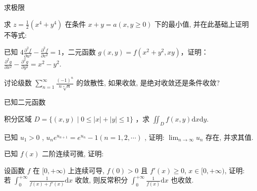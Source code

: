 求极限  \par
\par{}
求 $z = \frac{1}{2} (x^4 + y^4)$ 在条件 $x + y = a(x, y \geq 0)$ 下的最小值, 并在此基础上证明不等式:\par
\nopagebreak[4]
已知 $4\frac{\partial^2f}{\partial u^2} - \frac{\partial^2f}{\partial v^2} = 1$，二元函数 $g(x, y) = f(x^2 + y^2, xy)$，证明：$\frac{\partial^2g}{\partial x^2} - \frac{\partial^2g}{\partial y^2} = x^2 - y^2$.\par
讨论级数 $\sum_{n=1}^{\infty} \frac{(-1)^n}{n\sqrt[n]{n}}$ 的敛散性, 如果收敛, 是绝对收敛还是条件收敛?\par
\par{}
已知二元函数\par
\nopagebreak[4]
积分区域 $D = \{(x,y)\mid 0\leq |x| + |y|\leq 1\}$ ，求 $\iint_{D}f(x,y)\mathrm{d}x\mathrm{d}y.$\par
已知  $u_{1}>0$ ,  $u_{n}e^{u_{n+1}}=e^{u_{n}}-1(n=1,2,\cdots)$ , 证明:  $\lim_{n\to\infty}u_{n}$  存在, 并求其值.\par
\par{}
已知 $f(x)$ 二阶连续可微, 证明:\par
\nopagebreak[4]
设函数 $f$ 在 $[0, +\infty)$ 上连续可导, $f(0) > 0$ 且 $f'(x) \geq 0$, $x \in [0, +\infty)$, 证明: 若 $\int_0^{+\infty} \frac{1}{f(x) + f'(x)} \mathrm{d}x$ 收敛, 则反常积分 $\int_0^{+\infty} \frac{1}{f(x)} \mathrm{d}x$ 也收敛.\par
